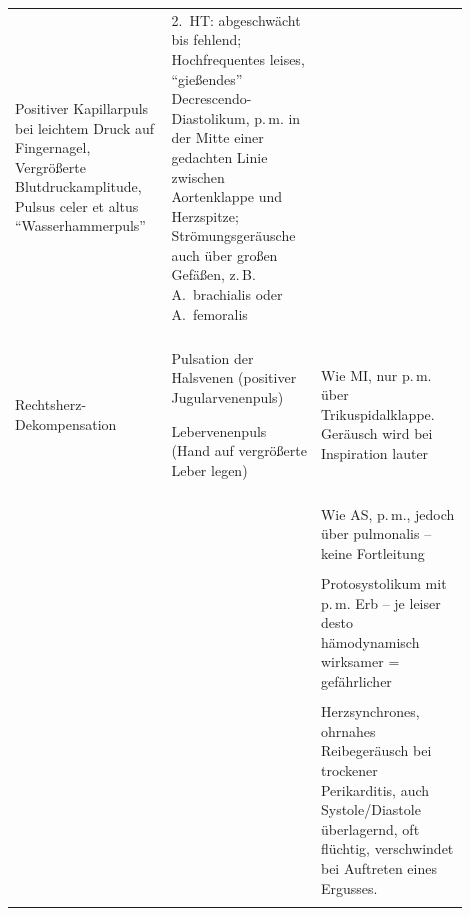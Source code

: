 \begin{WidePar}
{{\begin{longtable}{p{0.3\linewidth}p{0.3\linewidth}p{0.3\linewidth}}
Positiver Kapillarpuls bei leichtem Druck auf
  Fingernagel, Vergrößerte Blutdruckamplitude, Pulsus celer et altus \enquote{Wasserhammerpuls}

& 
2.~HT: abgeschwächt bis fehlend; 
Hochfrequentes leises, \enquote{gießendes} Decrescendo-Diastolikum,
p.\,m. in der Mitte einer gedachten Linie zwischen
Aortenklappe und Herzspitze; Strömungsgeräusche auch über
großen Gefäßen, z.\,B. A.~brachialis oder A.~femoralis

\\\addlinespace\midrule\addlinespace
\multicolumn{3}{c}{{\TabSub{Trikuspidalinsuffizienz}}}
\\\addlinespace\midrule\addlinespace
Rechtsherz-Dekompensation
& 
Pulsation der Halsvenen (positiver Jugularvenenpuls)

Lebervenenpuls (Hand auf vergrößerte Leber legen)

& 
Wie MI, nur p.\,m. über Trikuspidalklappe.
  Geräusch wird bei Inspiration lauter

\\\addlinespace\midrule\addlinespace
\multicolumn{3}{c}{{\TabSub{Pulmonalstenose}}}
\\\addlinespace\midrule\addlinespace
& 

& 
Wie AS, p.\,m., jedoch über pulmonalis -- keine
  Fortleitung


\\\addlinespace\midrule\addlinespace
\multicolumn{3}{c}{{\TabSub{Ventrikelseptumdefekt}}}
\\\addlinespace\midrule\addlinespace
& 



& 
Protosystolikum mit p.\,m. Erb -- je leiser desto
hämodynamisch wirksamer = gefährlicher

\\\addlinespace\midrule\addlinespace
\multicolumn{3}{c}{{\TabSub{Perikardgeräusche}}}
\\\addlinespace\midrule\addlinespace
& 
& 
Herzsynchrones, ohrnahes Reibegeräusch bei trockener
Perikarditis, auch Systole/Diastole überlagernd, oft
flüchtig, verschwindet bei Auftreten eines Ergusses.
% 
% 
% 

\\\addlinespace\bottomrule\addlinespace
\end{longtable}
}}
\end{WidePar}





